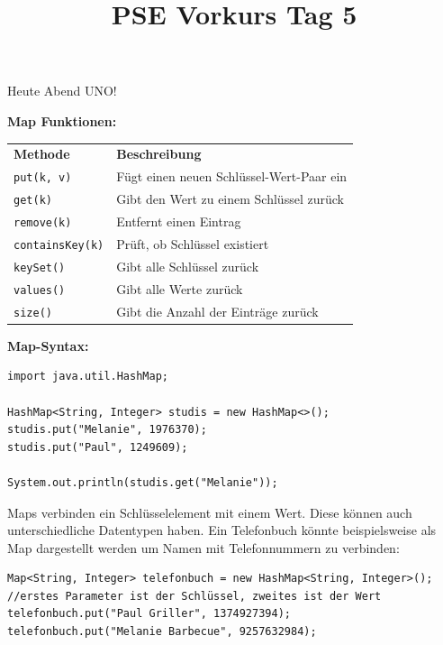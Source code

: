 \documentclass{../../sheet}
\title{PSE Vorkurs Tag 5}
\begin{document}
\maketitle
Heute Abend UNO!

\textbf{Map Funktionen:}
\begin{table}[h]
		\centering
		\begin{tabular}{l l}
			\rowcolor{tablehead}
			\textbf{Methode}        & \textbf{Beschreibung}                    \\
			\texttt{put(k, v)}      & Fügt einen neuen Schlüssel-Wert-Paar ein \\
			\texttt{get(k)}         & Gibt den Wert zu einem Schlüssel zurück  \\
			\texttt{remove(k)}      & Entfernt einen Eintrag                   \\
			\texttt{containsKey(k)} & Prüft, ob Schlüssel existiert            \\
			\texttt{keySet()}       & Gibt alle Schlüssel zurück               \\
			\texttt{values()}       & Gibt alle Werte zurück                   \\
			\texttt{size()}         & Gibt die Anzahl der Einträge zurück      \\
		\end{tabular}
	\end{table}

\textbf{Map-Syntax:}

\begin{verbatim}
import java.util.HashMap;

HashMap<String, Integer> studis = new HashMap<>();
studis.put("Melanie", 1976370);
studis.put("Paul", 1249609);

System.out.println(studis.get("Melanie"));
	\end{verbatim}


\newpage
{}
Maps verbinden ein Schlüsselelement mit einem Wert. Diese können auch unterschiedliche Datentypen haben. Ein Telefonbuch könnte beispielsweise als Map dargestellt werden um Namen mit Telefonnummern zu verbinden:
\begin{verbatim}
Map<String, Integer> telefonbuch = new HashMap<String, Integer>();
//erstes Parameter ist der Schlüssel, zweites ist der Wert
telefonbuch.put("Paul Griller", 1374927394);
telefonbuch.put("Melanie Barbecue", 9257632984);
\end{verbatim}
\end{document}
